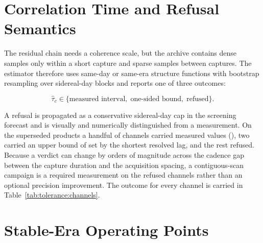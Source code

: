 
\section{Correlation Time and Refusal Semantics}
\label{sec:calibration:correlation}

The residual chain needs a coherence scale, but the archive contains dense
samples only within a short capture and sparse samples between captures.  The
estimator therefore uses same-day or same-era structure functions with
bootstrap resampling over sidereal-day blocks and reports one of three outcomes:

\begin{equation}
  \widehat\tau_c \in
  \{\text{measured interval},\; \text{one-sided bound},\; \text{refused}\}.
\end{equation}

A refusal is propagated as a conservative sidereal-day cap in the screening
forecast and is visually and numerically distinguished from a measurement.  On
the superseded products a handful of channels carried measured values
(), two carried an upper bound of
 set by the shortest resolved lag, and the rest refused.
Because a verdict can change by orders of magnitude across the cadence gap
between the capture duration and the acquisition spacing, a contiguous-scan
campaign is a required measurement on the refused channels rather than an
optional precision improvement.  The outcome for every channel is carried in
Table~\ref{tab:tolerance:channels}.

\section{Stable-Era Operating Points}
\label{sec:calibration:operating}

